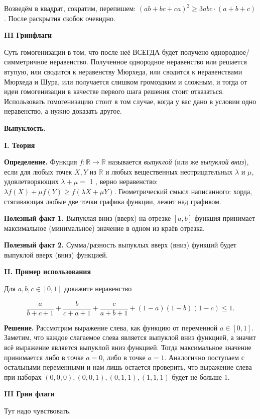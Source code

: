 Возведём в квадрат, сократим, перепишем: $(a b+b c+c a)^2 \geqslant 3 a b c \cdot(a+b+c)$. После раскрытия скобок очевидно.

\textbf{III Гринфлаги}

Суть гомогенизации в том, что после неё ВСЕГДА будет получено однородное/симметричное неравенство. Полученное однородное неравенство или решается втупую, или сводится к неравенству Мюрхеда, или сводится к неравенствами Мюрхеда и Шура, или получается слишком громоздким и сложным, и тогда от идеи гомогенизации в качестве первого шага решения стоит отказаться. Использовать гомогенизацию стоит в том случае, когда у вас дано в условии одно неравенство, а нужно доказать другое.

\textbf{\Large Выпуклость.}

\textbf{I. Теория}

\textbf{Определение.} Функция $f: \mathbb{R} \rightarrow \mathbb{R}$ называется \textit{выпуклой} (или же \textit{выпуклой вниз}), если для любых точек $X, Y$ из $\mathbb{R}$ и любых вещественных неотрицательных $\lambda$ и $\mu$, удовлетворяющих $\lambda+\mu=$ 1 , верно неравенство: $\lambda f(X)+\mu f(Y) \geqslant f(\lambda X+\mu Y)$. Геометрический смысл написанного: хорда, стягивающая любые две точки графика функции, лежит над графиком.

\textbf{Полезный факт 1.} Выпуклая вниз (вверх) на отрезке $[a,b]$ функция принимает максимальное (минимальное) значение в одном из краёв отрезка.

\textbf{Полезный факт 2.} Сумма/разность выпуклых вверх (вниз) функций будет выпуклой вверх (вниз) функцией.

\textbf{II. Пример использования}

Для $a, b, c \in[0,1]$ докажите неравенство

$$
\frac{a}{b+c+1}+\frac{b}{c+a+1}+\frac{c}{a+b+1}+(1-a)(1-b)(1-c) \leqslant 1 .
$$

\textbf{Решение.}
Рассмотрим выражение слева, как функцию от переменной $a \in [0,1]$. Заметим, что каждое слагаемое слева является выпуклой вниз функцией, а значит всё выражение является выпуклой вниз функцией. Тогда максимальное значение принимается либо в точке $a=0$, либо в точке $a=1$. Аналогично поступаем с остальными переменными и нам лишь остается проверить, что выражение слева при наборах $(0,0,0), (0,0,1), (0,1,1), (1,1,1)$ будет не больше 1. 

\textbf{III Грин флаги}

Тут надо чувствовать.